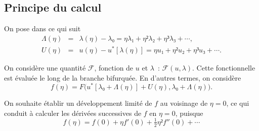 \documentclass[12pt, final]{amsart}
\begin{document}
\subsection{Principe du calcul}
\label{sec:20220107121442}

On pose dans ce qui suit
\begin{eqnarray}
  \label{eq:20211112155446}
  Λ(η)&=&λ(η)-λ₀=ηλ₁+η²λ₂+η³λ₃+\cdots,\\
  \label{eq:20211112113028}
  U(η)&=&u(η)-u^*[λ(η)]=ηu₁+η²u₂+η³u₃+\cdots.
\end{eqnarray}

On considère une quantité \(ℱ\), fonction de \(u\) et \(λ\)~: \(ℱ(u,
λ)\). Cette fonctionnelle est évaluée le long de la branche bifurquée. En
d'autres termes, on considère
\begin{equation}
  f(η)=F\bigl(u^*[λ₀+Λ(η)]+U(η), λ₀+Λ(η)\bigr).
\end{equation}

On souhaite établir un développement limité de \(f\) au voisinage de \(η=0\),
ce qui conduit à calculer les dérivées successives de \(f\) en \(η=0\), puisque
\begin{equation}
  f(η)=f(0)+η f'(0)+\tfrac12η²f''(0)+\cdots
\end{equation}
\end{document}
